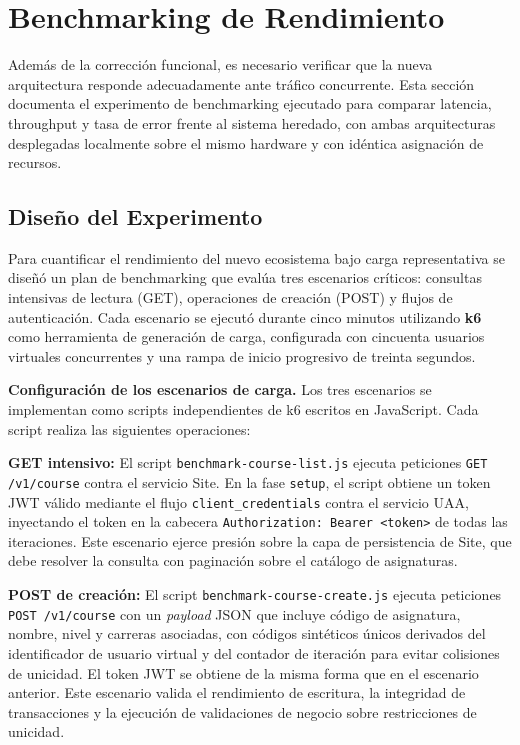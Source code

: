 \section{Benchmarking de Rendimiento}
\label{sec:benchmark}

Además de la corrección funcional, es necesario verificar que la nueva
arquitectura responde adecuadamente ante tráfico concurrente. Esta sección
documenta el experimento de benchmarking ejecutado para comparar latencia,
throughput y tasa de error frente al sistema heredado, con ambas arquitecturas
desplegadas localmente sobre el mismo hardware y con idéntica asignación de
recursos.

\subsection{Diseño del Experimento}

Para cuantificar el rendimiento del nuevo ecosistema bajo carga representativa se
diseñó un plan de benchmarking que evalúa tres escenarios críticos: consultas
intensivas de lectura (GET), operaciones de creación (POST) y flujos de
autenticación. Cada escenario se ejecutó durante cinco minutos utilizando
\textbf{k6}~\cite{k62024} como herramienta de generación de carga, configurada con cincuenta
usuarios virtuales concurrentes y una rampa de inicio progresivo de treinta
segundos.

\textbf{Configuración de los escenarios de carga.} Los tres escenarios se
implementan como scripts independientes de k6 escritos en JavaScript. Cada script
realiza las siguientes operaciones:

\textbf{GET intensivo:} El script \texttt{benchmark-course-list.js} ejecuta
peticiones \texttt{GET /v1/course} contra el servicio Site. En la fase
\texttt{setup}, el script obtiene un token JWT válido mediante el flujo
\texttt{client\_credentials} contra el servicio UAA, inyectando el token en la
cabecera \texttt{Authorization: Bearer <token>} de todas las iteraciones. Este
escenario ejerce presión sobre la capa de persistencia de Site, que debe resolver
la consulta con paginación sobre el catálogo de asignaturas.

\textbf{POST de creación:} El script \texttt{benchmark-course-create.js} ejecuta
peticiones \texttt{POST /v1/course} con un \textit{payload} JSON que incluye código de
asignatura, nombre, nivel y carreras asociadas, con códigos sintéticos únicos
derivados del identificador de usuario virtual y del contador de iteración para
evitar colisiones de unicidad. El token JWT se obtiene de la misma
forma que en el escenario anterior. Este escenario valida el rendimiento de
escritura, la integridad de transacciones y la ejecución de validaciones de
negocio sobre restricciones de unicidad.

